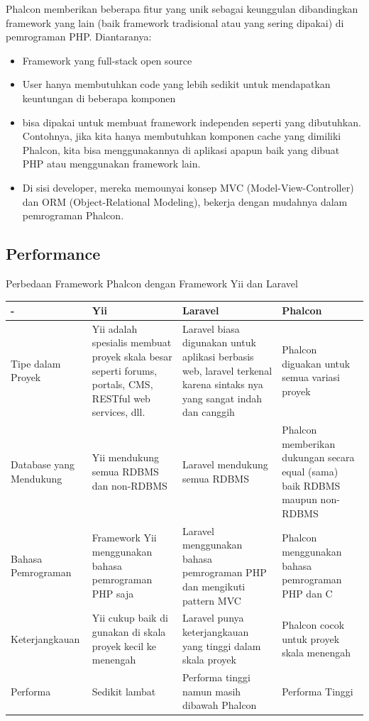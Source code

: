 \documentclass{wileySix}
\begin{document}
Phalcon memberikan beberapa fitur yang unik sebagai keunggulan dibandingkan framework yang lain (baik framework tradisional atau yang sering dipakai) di pemrograman PHP. Diantaranya:

\begin{itemize}
 \item Framework yang full-stack open source

 \item User hanya membutuhkan code yang lebih sedikit untuk mendapatkan keuntungan di beberapa komponen

 \item bisa dipakai untuk membuat framework independen seperti yang dibutuhkan. Contohnya, jika kita hanya membutuhkan komponen cache yang dimiliki Phalcon, kita bisa menggunakannya di aplikasi apapun baik yang dibuat PHP atau menggunakan framework lain.

 \item Di sisi developer, mereka memounyai konsep MVC (Model-View-Controller) dan ORM (Object-Relational Modeling), bekerja dengan mudahnya dalam pemrograman Phalcon.
 \end{itemize}

\subsection{Performance}

Perbedaan Framework Phalcon dengan Framework Yii dan Laravel

\begin{center}
 \begin{tabular}{ | m{2em} | m{3cm}| m{3cm} | m{3cm} }
 \hline
 - & Yii & Laravel & Phalcon \\ [0.5ex]
 \hline\hline
 Tipe dalam Proyek & Yii adalah spesialis membuat proyek skala besar seperti forums, portals, CMS, RESTful web services, dll. & Laravel biasa digunakan untuk aplikasi berbasis web, laravel terkenal karena sintaks nya yang sangat indah dan canggih & Phalcon diguakan untuk semua variasi proyek \\
 \hline
 Database yang Mendukung & Yii mendukung semua RDBMS dan non-RDBMS & Laravel mendukung semua RDBMS & Phalcon memberikan dukungan secara equal (sama) baik RDBMS maupun non-RDBMS \\
 \hline
 Bahasa Pemrograman & Framework Yii menggunakan bahasa pemrograman PHP saja & Laravel menggunakan bahasa pemrograman PHP dan mengikuti pattern MVC & Phalcon menggunakan bahasa pemrograman PHP dan C \\
 \hline
 Keterjangkauan & Yii cukup baik di gunakan di skala proyek kecil ke menengah & Laravel punya keterjangkauan yang tinggi dalam skala proyek & Phalcon cocok untuk proyek skala menengah \\
 \hline
 Performa & Sedikit lambat & Performa tinggi namun masih dibawah Phalcon & Performa Tinggi \\ [1ex]
 \hline
\end{tabular}
\end{center}
\end{document}
